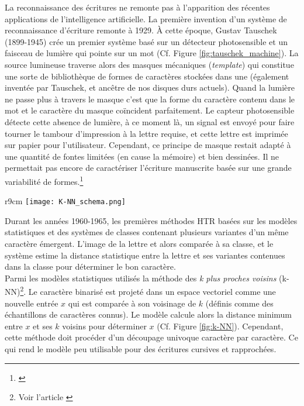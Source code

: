 La reconnaissance des écritures ne remonte pas à l'apparition des récentes applications de l'intelligence artificielle. La première invention d'un système de reconnaissance d'écriture remonte à 1929. À cette époque, Gustav Tauschek (1899-1945) crée un premier système basé sur un détecteur photosensible et un faisceau de lumière qui pointe sur un mot (Cf. Figure \ref{fig:tauschek_machine}). La source lumineuse traverse alors des masques mécaniques (\textit{template}) qui constitue une sorte de bibliothèque de formes de caractères stockées dans une  (également inventée par Tauschek, et ancêtre de nos disques durs actuels). Quand la lumière ne passe plus à travers le masque c'est que la forme du caractère contenu dans le mot et le caractère du masque coïncident parfaitement. Le capteur photosensible détecte cette absence de lumière, à ce moment là, un signal est envoyé pour faire tourner le tambour d'impression à la lettre requise, et cette lettre est imprimée sur papier pour l'utilisateur. Cependant, ce principe de masque restait adapté à une quantité de fontes limitées (en cause la mémoire) et bien dessinées. Il ne permettait pas encore de caractériser l'écriture manuscrite basée sur une grande variabilité de formes.\footnote{\cite{ouji_segmentation_2012}}\\

\begin{wrapfigure}[20]{r}{9cm}
    \centering
    \texttt{[image: K-NN\_schema.png]}
    \caption{Illustration simplifiée de la \textit{méthode des k plus proches voisins} (k-NN) \textcopyright L. Terriel, 2020, Diagrams.net}
    \label{fig:k-NN}
\end{wrapfigure}

Durant les années 1960-1965, les premières méthodes HTR basées sur les modèles statistiques et des systèmes de classes contenant plusieurs variantes d'un même caractère émergent. L'image de la lettre et alors comparée à sa classe, et le système estime la distance statistique entre la lettre et ses variantes contenues dans la classe pour déterminer le bon caractère.\\

Parmi les modèles statistiques utilisés la méthode des \textit{k plus proches voisins} (k-NN)\footnote{Voir l'article \cite{wikipedia_methode_nodate}}. Le caractère binarisé est projeté dans un espace vectoriel comme une nouvelle entrée $ x $ qui est comparée à son voisinage de $ k $ (définis comme des échantillons de caractères connus). Le modèle calcule alors la distance minimum entre $ x $ et ses $ k $ voisins pour déterminer $ x $ (Cf. Figure \ref{fig:k-NN}). Cependant, cette méthode doit procéder d'un découpage univoque caractère par caractère. Ce qui rend le modèle peu utilisable pour des écritures cursives et rapprochées.\\

